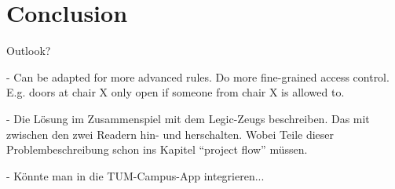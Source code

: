 \section{Conclusion}\label{sec:conclusion}


Outlook?

- Can be adapted for more advanced rules. Do more fine-grained access control. E.g. doors at chair X only open if someone from chair X is allowed to.

- Die Lösung im Zusammenspiel mit dem Legic-Zeugs beschreiben. Das mit zwischen den zwei Readern hin- und herschalten.
Wobei Teile dieser Problembeschreibung schon ins Kapitel ``project flow'' müssen.

- Könnte man in die TUM-Campus-App integrieren...